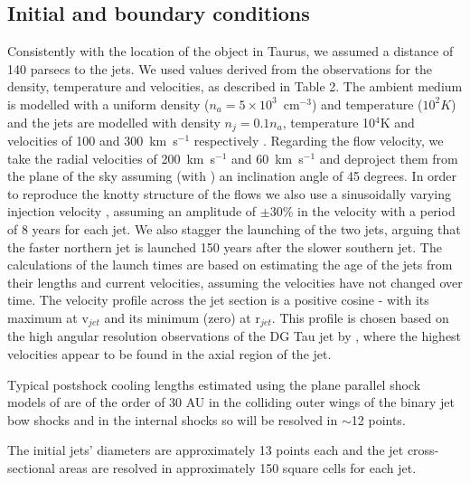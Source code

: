 \documentclass{aa}
\begin{document}
\subsection{Initial and boundary conditions}

Consistently with the location of the object in Taurus, we 
assumed a distance of 140 parsecs to the jets. We used values derived from the
observations for the density, temperature and velocities, as described in Table 2.
The ambient medium is modelled
with a uniform density ($n_a=5 \times 10^{3}$~cm$^{-3}$) and temperature
($10^2 K$) and the jets are modelled with density $n_j=0.1 n_a$,
temperature 10$^4$K and velocities of 100 and 300~km~s$^{-1}$ respectively
\citep{2005ApJ...L}. Regarding the flow velocity, 
we take the radial velocities of \citet{2000AJ....119.1872H} 200~km~s$^{-1}$ and
60~km~s$^{-1}$ and deproject
them from the plane of the sky assuming (with \citet{2000AJ....119.1872H}) an
inclination angle of 45 degrees. 
In order to reproduce the knotty structure of the flows we also 
use a sinusoidally varying injection velocity
\citep{1990ApJ...364..601R}, assuming an amplitude of
$\pm$30\% in the velocity with a period of 8 years for each jet. 
We also stagger the launching of the two jets, arguing that the faster 
northern jet is launched 150 years after the slower southern jet.
The calculations of the launch times are based on estimating the age of the jets
from their lengths and current velocities, assuming the velocities have not
changed over time.
The velocity profile across the jet section is a positive cosine - with its maximum at v$_{jet}$ and its minimum (zero) 
at r$_{jet}$. This profile is chosen based on the high angular resolution observations 
of the DG Tau jet by \citet{2000ApJ...537L..49B}, where the highest velocities 
appear to be found in the axial region of the jet.

Typical postshock cooling lengths estimated using the plane parallel shock models of \citet{1987ApJ...316..323H} are of the order of 30 AU in the colliding outer wings of the binary jet bow shocks and in the internal shocks so will be
resolved in $\sim$12 points.

The initial jets' diameters are approximately 13 points each and the jet cross-sectional areas are resolved in approximately 150 square cells for each jet.
\end{document}
